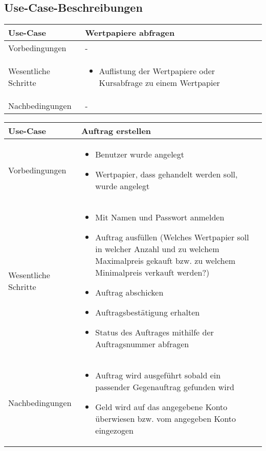 \documentclass[12pt, a4paper, titlepage]{article}
\begin{document}
\subsection{Use-Case-Beschreibungen}
\begin{tabular}{|p{}|p{}|}
	\hline
	Use-Case & Wertpapiere abfragen \\
	\hline
	Vorbedingungen & - \\
	\hline
	Wesentliche Schritte &
		\begin{itemize}
			\item Auflistung der Wertpapiere oder Kursabfrage zu einem Wertpapier
		\end{itemize} \\
	\hline
	Nachbedingungen & - \\
	\hline
\end{tabular}\par

\begin{tabular}{|p{}|p{}|}
	\hline
	Use-Case & Auftrag erstellen \\
	\hline
	Vorbedingungen &
		\begin{itemize}
			\item Benutzer wurde angelegt
			\item Wertpapier, dass gehandelt werden soll, wurde angelegt
		\end{itemize} \\
	\hline
	Wesentliche Schritte &
		\begin{itemize}
			\item Mit Namen und Passwort anmelden
			\item Auftrag ausfüllen (Welches Wertpapier soll in welcher Anzahl und zu
			welchem Maximalpreis gekauft bzw. zu welchem Minimalpreis verkauft werden?)
			\item Auftrag abschicken
			\item Auftragsbestätigung erhalten
			\item Status des Auftrages mithilfe der Auftragsnummer abfragen
		\end{itemize} \\
	\hline
	Nachbedingungen &
		\begin{itemize}
			\item Auftrag wird ausgeführt sobald ein passender Gegenauftrag gefunden
			wird
			\item Geld wird auf das angegebene Konto überwiesen bzw. vom angegeben Konto
			eingezogen
		\end{itemize} \\
	\hline
\end{tabular}\par
\end{document}

